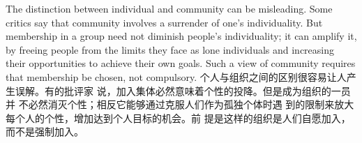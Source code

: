 \begin{paracol}{2}
\switchcolumn*
The distinction between individual and community can be
misleading. Some critics say that community involves a surrender of one's individuality. But membership in a group need not
diminish people's individuality; it can amplify it, by freeing
people from the limits they face as lone individuals and increasing their opportunities to achieve their own goals. Such a view
of community requires that membership be chosen, not compulsory.
\switchcolumn
个人与组织之间的区别很容易让人产生误解。有的批评家
说，加入集体必然意味着个性的投降。但是成为组织的一员并
不必然消灭个性；相反它能够通过克服人们作为孤独个体时遇
到的限制来放大每个人的个性，增加达到个人目标的机会。前
提是这样的组织是人们自愿加入，而不是强制加入。



\end{paracol}
